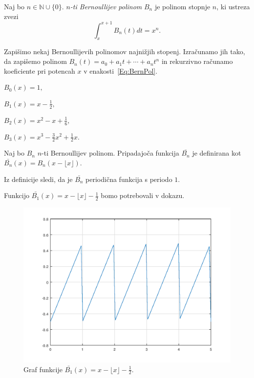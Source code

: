 \documentclass[mat1]{fmfdelo}
\begin{document}
\begin{definicija}
Naj bo $n \in \mathbb{N} \cup \{0\}.$ \emph{$n$-ti Bernoullijev polinom} $B_{n}$ je polinom stopnje $n$, ki ustreza zvezi
\begin{equation}
\label{Eq:BernPol}
\int_{x}^{x+1} B_{n}(t) dt = x^{n}.
\end{equation}
\end{definicija}

\begin{primer}
Zapišimo nekaj Bernoullijevih polinomov najnižjih stopenj. Izračunamo jih tako, da zapišemo polinom $B_{n}(t) = a_{0} + a_{1}t + \cdots + a_{n}t^{n}$ in rekurzivno računamo koeficiente pri potencah $x$ v enakosti~\eqref{Eq:BernPol}.

\( B_{0}(x) = 1, \)

\( B_{1}(x) = x - \frac{1}{2}, \)

\( B_{2}(x) = x^2 - x + \frac{1}{6}, \)

\( B_{3}(x) = x^3 - \frac{3}{2} x^2 + \frac{1}{2} x. \)
\end{primer}

\begin{definicija}
Naj bo $B_{n}$ $n$-ti Bernoullijev polinom. Pripadajoča funkcija $ \bar{B_{n}} $ je definirana kot $ \bar{B_{n}}(x) = B_{n}(x - \lfloor x \rfloor). $
\end{definicija}

\begin{opomba}
Iz definicije sledi, da je $ \bar{B_{n}} $ periodična funkcija s periodo $1$.
\end{opomba}

\begin{primer}
Funkcijo $ \bar{B_{1}}(x) = x - \lfloor x \rfloor - \frac{1}{2} $ bomo potrebovali v dokazu.
\end{primer}

\begin{figure}[h!]
\begin{center}
\includegraphics[scale=0.4]{bernoulli.png}
\caption{Graf funkcije $ \bar{B_{1}}(x) = x - \lfloor x \rfloor - \frac{1}{2} $.}
\end{center}
\end{figure}
\end{document}
